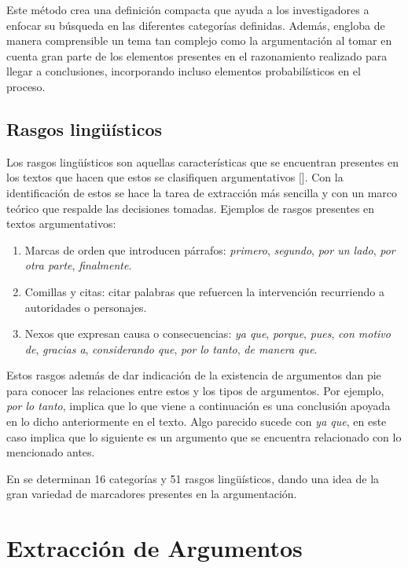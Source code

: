 \documentclass[a4paper,11pt,twocolumn,twoside]{article}
\begin{document}
Este método crea una definición compacta que ayuda a los investigadores a enfocar su búsqueda 
en las diferentes categorías definidas. Además, engloba de manera comprensible un tema tan complejo 
como la argumentación al tomar en cuenta gran parte de los elementos presentes en el razonamiento
realizado para llegar a conclusiones, incorporando incluso elementos probabilísticos en el proceso. 

\subsection{Rasgos lingüísticos}

Los rasgos lingüísticos son aquellas características que se encuentran presentes en los textos 
que hacen que estos se clasifiquen argumentativos [\cite{venegas2005hacia}]. Con 
la identificación de estos se hace la tarea de extracción más sencilla y con un marco teórico 
que respalde las decisiones tomadas. Ejemplos de rasgos presentes en textos argumentativos:

\begin{enumerate}
    \item Marcas de orden que introducen párrafos: \textit{primero}, \textit{segundo}, \textit{por un lado}, 
    \textit{por otra parte}, \textit{finalmente}.
    \item Comillas y citas: citar palabras que refuercen la intervención recurriendo a autoridades
    o personajes.
    \item Nexos que expresan causa o consecuencias: \textit{ya que}, \textit{porque}, \textit{pues}, 
    \textit{con motivo de}, \textit{gracias a}, \textit{considerando que}, \textit{por lo tanto}, \textit{de manera que}.
\end{enumerate}

Estos rasgos además de dar indicación de la existencia de argumentos dan pie para conocer las relaciones
entre estos y los tipos de argumentos. Por ejemplo, \textit{por lo tanto}, implica que lo que viene 
a continuación es una conclusión apoyada en lo dicho anteriormente en el texto. Algo parecido
sucede con \textit{ya que}, en este caso implica que lo siguiente es un argumento que se encuentra 
relacionado con lo mencionado antes.

En
\textcite{venegas2005hacia}
se determinan 16 categorías y 51 rasgos lingüísticos, dando una idea 
de la gran variedad de marcadores presentes en la argumentación.

\section{Extracción de Argumentos}
\end{document}
